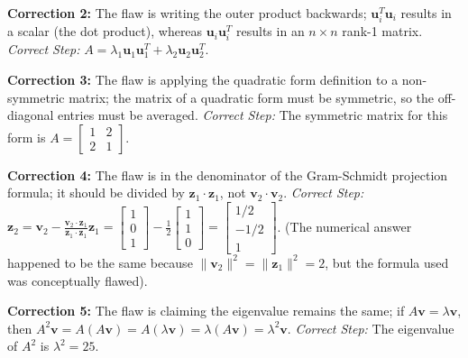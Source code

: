 \documentclass[11pt, letterpaper]{article}
\theoremstyle{definition}
\theoremstyle{remark}
\begin{document}
\textbf{Correction 2:} The flaw is writing the outer product backwards; $\mathbf{u}_i^T \mathbf{u}_i$ results in a scalar (the dot product), whereas $\mathbf{u}_i \mathbf{u}_i^T$ results in an $n \times n$ rank-1 matrix.
\textit{Correct Step:} $A = \lambda_1 \mathbf{u}_1 \mathbf{u}_1^T + \lambda_2 \mathbf{u}_2 \mathbf{u}_2^T$.

\textbf{Correction 3:} The flaw is applying the quadratic form definition to a non-symmetric matrix; the matrix of a quadratic form must be symmetric, so the off-diagonal entries must be averaged.
\textit{Correct Step:} The symmetric matrix for this form is $A = \begin{bmatrix} 1 & 2 \\ 2 & 1 \end{bmatrix}$.

\textbf{Correction 4:} The flaw is in the denominator of the Gram-Schmidt projection formula; it should be divided by $\mathbf{z}_1 \cdot \mathbf{z}_1$, not $\mathbf{v}_2 \cdot \mathbf{v}_2$.
\textit{Correct Step:} $\mathbf{z}_2 = \mathbf{v}_2 - \frac{\mathbf{v}_2 \cdot \mathbf{z}_1}{\mathbf{z}_1 \cdot \mathbf{z}_1} \mathbf{z}_1 = \begin{bmatrix} 1 \\ 0 \\ 1 \end{bmatrix} - \frac{1}{2} \begin{bmatrix} 1 \\ 1 \\ 0 \end{bmatrix} = \begin{bmatrix} 1/2 \\ -1/2 \\ 1 \end{bmatrix}$. (The numerical answer happened to be the same because $\|\mathbf{v}_2\|^2 = \|\mathbf{z}_1\|^2 = 2$, but the formula used was conceptually flawed).

\textbf{Correction 5:} The flaw is claiming the eigenvalue remains the same; if $A\mathbf{v} = \lambda\mathbf{v}$, then $A^2\mathbf{v} = A(A\mathbf{v}) = A(\lambda\mathbf{v}) = \lambda(A\mathbf{v}) = \lambda^2\mathbf{v}$.
\textit{Correct Step:} The eigenvalue of $A^2$ is $\lambda^2 = 25$.
\end{document}
